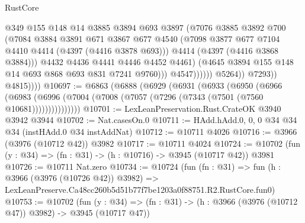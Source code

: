 \begin{lexlean}{RustCore}
\begin{coremodule}
                                    @349
                                    @155
                                    @148
                                    @14
                                    @3885
                                    @3894
                                    @693
                                    @3897
                                    (@7076
                                      @3885
                                      @3892
                                      @700
                                      (@7084
                                        @3884
                                        @3891
                                        @671
                                        @3867
                                        @677
                                        @4540
                                        (@7098
                                          @3877
                                          @677
                                          @7104
                                          @4410
                                          @4414
                                          (@4397 (@4416 @3878 @693)))
                                        @4414
                                        (@4397 (@4416 @3868 @3884)))
                                      @4432
                                      @4436
                                      @4441
                                      @4446
                                      @4452
                                      @4461)
                                    (@4645 @3894 @155 @148 @14 @693 @868 @693 @831 @7241 @9760)))
                                @4547))))))
                    @5264))
                @7293))
            @4815))))
@10697 := @6863
    (@6888
      (@6929
        (@6931
          (@6933
            (@6950
              (@6966
                (@6983 (@6996 (@7004 (@7008 (@7057 (@7296 (@7343 (@7501 (@7560 @10681)))))))))))))))
@10701 := LexLeanPreservation.Rust.CrateOK @3940 @3942 @3944
@10702 := Nat.casesOn.{0}
@10711 := HAdd.hAdd.{0, 0, 0} @34 @34 @34 (instHAdd.{0} @34 instAddNat)
@10712 := @10711 @4026
@10716 := @3966 (@3976 (@10712 @42)) @3982
@10717 := @10711 @4024
@10724 := @10702 (fun (y : @34) => (fn : @31) -> (h : @10716) -> @3945 (@10717 @42)) @3981
@10726 := @10711 Nat.zero
@10734 := @10724
    (fun (fn : @31) =>
    fun (h : @3966 (@3976 (@10726 @42)) @3982) =>
    LexLeanPreserve.Ca48cc260b5d51b77f7be1203a0f88751.R2.RustCore.fun0)
@10753 := @10702
    (fun (y : @34) => (fn : @31) -> (h : @3966 (@3976 (@10712 @47)) @3982) -> @3945 (@10717 @47))

\end{coremodule}
\end{lexlean}
